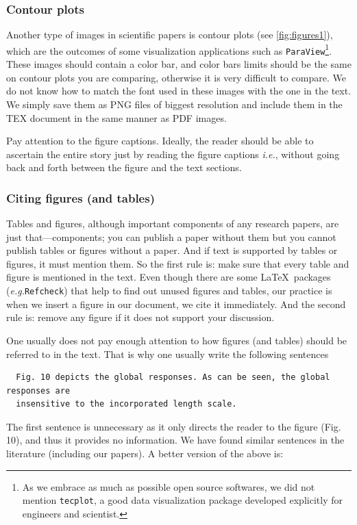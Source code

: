 \documentclass[authoryear,3p,times,preprint,review,fleqn]{elsarticle}
\newcommand{\eg}{\textit{e.g.}\xspace}
\newcommand{\ie}{\textit{i.e.},\xspace}
\numberwithin{equation}{section}
\theoremstyle{remark}
\begin{document}

\subsubsection{Contour plots}\label{sec:contours}

Another type of images in scientific papers is contour plots (see \cref{fig:figures1}), which are the outcomes of some visualization applications such as \texttt{ParaView}\footnote{As we embrace as much as possible open source softwares, we did not mention \texttt{tecplot},  a good data visualization package developed explicitly for engineers and scientist.}. These images should contain a color bar, and color bars limits should be the same on contour plots you are comparing, otherwise it is very difficult to compare. We do not know how to match the font used in these images with the one in the text. We simply save them as PNG files of biggest resolution and include them in the TEX document in the same manner as PDF images.

 Pay attention to the figure captions. Ideally, the reader should be able to ascertain the entire story just by reading the figure captions \ie without going back and forth between the figure and the text sections.

 \subsubsection{Citing figures (and tables)}\label{sec:citing-figs}


Tables and figures, although important components of any research papers, are just that—components; you can publish a paper without them but you cannot publish tables or figures without a paper. And if text is supported by tables or figures, it must mention them. So the first rule is: make sure that every table and figure is mentioned in the text. Even though there are some \LaTeX\ packages (\eg \texttt{Refcheck}) that help to find out unused figures and tables, our practice is when we insert a figure in our document, we cite it immediately. And the second rule is: remove any figure if it does not support your discussion.

One usually does not pay enough attention to how figures (and tables) should be referred to in the text. That is why one usually write the following sentences

 \begin{verbatim}
  Fig. 10 depicts the global responses. As can be seen, the global responses are 
  insensitive to the incorporated length scale.
 \end{verbatim}
The first sentence is unnecessary as it only directs the reader to the figure (Fig. 10), and thus it provides no information. We have found similar sentences in the literature (including our papers). A better version of the above is:
\end{document}
